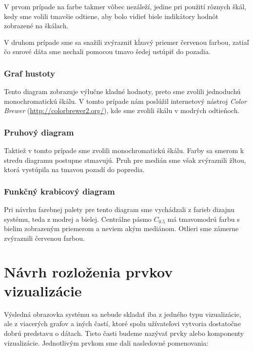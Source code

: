 V prvom prípade na farbe takmer vôbec nezáleží, jedine pri použití rôznych škál, kedy sme volili tmavšie odtiene, aby bolo vidieť biele indikátory hodnôt zobrazené na škálach.

V druhom prípade sme sa snažili zvýrazniť kĺzavý priemer červenou farbou, zatiaľ čo surové dáta sme nechali pomocou tmavo šedej ustúpiť do pozadia.

\subsubsection{Graf hustoty} 
Tento diagram zobrazuje výlučne kladné hodnoty, preto sme zvolili jednoduchú monochromatickú škálu. V tomto prípade nám poslúžil internetový nástroj \textit{Color Brewer} (\url{http://colorbrewer2.org/}), kde sme zvolili škálu v modrých odtieňoch.

\subsubsection{Pruhový diagram} 
Taktiež v tomto prípade sme zvolili monochromatickú škálu. Farby sa smerom k stredu diagramu postupne stmavujú. Pruh pre medián sme však zvýraznili žltou, ktorá vystúpila na tmavou pozadí do popredia.

\subsubsection{Funkčný krabicový diagram} 
Pri návrhu farebnej palety pre tento diagram sme vychádzali z farieb dizajnu systému, teda z modrej a bielej. Centrálne pásmo $ C_{0.5} $ má tmavomodrú farbu s bielim zobrazeným priemerom a neviem akým mediánom. %
Otlieri sme zámerne zvýraznili červenou farbou.

\section{Návrh rozloženia prvkov vizualizácie}
Výsledná obrazovka systému sa nebude skladať iba z jedného typu vizualizácie, ale z viacerých grafov a iných častí, ktoré spolu užívateľovi vytvoria dostatočne dobrú predstavu o dátach. Tieto časti budeme nazývať prvky alebo komponenty vizualizácie. Jednotlivým prvkom sme dali nasledovné pomenovania: 

